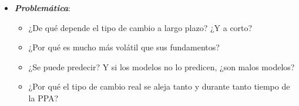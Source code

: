 \documentclass[11pt]{article}
\begin{document}
\begin{itemize}
\begin{itemize}
\begin{itemize}
    \item y nuevas líneas teóricas: el tipo de cambio como precio de un activo, que se parece a un paseo aleatorio aunque dependa de los fundamentos\nocite{EngelWest2005}; la política monetaria como regla de ; la microestructura del mercado y los intermediarios financieros.
    \end{itemize}
  \item \emph{El tipo de cambio real}: la PPA relativa sigue siendo una buena primera aproximación a largo plazo, pero las desviaciones duran años\nocite{Rogoff1996PPA}. En la práctica, el FMI y los analistas estiman tipos reales de equilibrio con modelos empíricos\nocite{FMI2013EBA}.
  \end{itemize}

\item \textbf{\emph{Problemática}}:
  \begin{itemize}
  \item ¿De qué depende el tipo de cambio a largo plazo? ¿Y a corto?
  \item ¿Por qué es mucho más volátil que sus fundamentos?
  \item ¿Se puede predecir? Y si los modelos no lo predicen, ¿son malos modelos?
  \item ¿Por qué el tipo de cambio real se aleja tanto y durante tanto tiempo de la PPA?
  \end{itemize}


\end{itemize}
\end{document}
